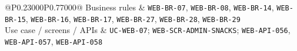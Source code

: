 \begin{longtable}{@{}P{0.23000\SRSWidth}P{0.77000\SRSWidth}@{}}
Business rules & \texttt{WEB-\allowbreak{}BR-\allowbreak{}07}, \texttt{WEB-\allowbreak{}BR-\allowbreak{}08}, \texttt{WEB-\allowbreak{}BR-\allowbreak{}14}, \texttt{WEB-\allowbreak{}BR-\allowbreak{}15}, \texttt{WEB-\allowbreak{}BR-\allowbreak{}16}, \texttt{WEB-\allowbreak{}BR-\allowbreak{}17}, \texttt{WEB-\allowbreak{}BR-\allowbreak{}27}, \texttt{WEB-\allowbreak{}BR-\allowbreak{}28}, \texttt{WEB-\allowbreak{}BR-\allowbreak{}29} \\[3pt]
Use case /\allowbreak{} screens /\allowbreak{} APIs & \texttt{UC-\allowbreak{}WEB-\allowbreak{}07}; \texttt{WEB-\allowbreak{}SCR-\allowbreak{}ADMIN-\allowbreak{}SNACKS}; \texttt{WEB-\allowbreak{}API-\allowbreak{}056}, \texttt{WEB-\allowbreak{}API-\allowbreak{}057}, \texttt{WEB-\allowbreak{}API-\allowbreak{}058} \\[3pt]
\end{longtable}
\endgroup

